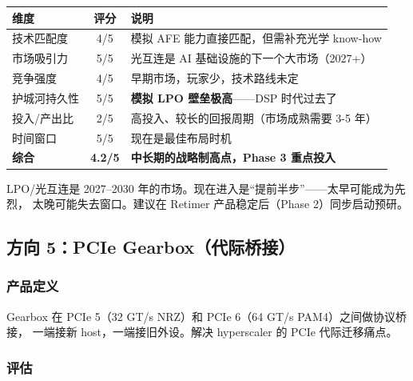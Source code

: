 \documentclass[11pt,a4paper]{ctexart}
\begin{document}
\begin{table}[htb]
    \centering
    \begin{tabular}{l c p{}}
        \toprule
        \textbf{维度} & \textbf{评分} & \textbf{说明} \\
        \midrule
        技术匹配度 & 4/5 & 模拟 AFE 能力直接匹配，但需补充光学 know-how \\
        市场吸引力 & 5/5 & 光互连是 AI 基础设施的下一个大市场（2027+） \\
        竞争强度 & 4/5 & 早期市场，玩家少，技术路线未定 \\
        护城河持久性 & 5/5 & \textbf{模拟 LPO 壁垒极高}——DSP 时代过去了 \\
        投入/产出比 & 2/5 & 高投入、较长的回报周期（市场成熟需要 3-5 年） \\
        时间窗口 & 5/5 & 现在是最佳布局时机 \\
        \midrule
        \rowcolor{strong}
        \textbf{综合} & \textbf{4.2/5} & \textbf{中长期的战略制高点，Phase 3 重点投入} \\
        \bottomrule
    \end{tabular}
\end{table}

\begin{warningbox}
    LPO/光互连是 2027--2030 年的市场。现在进入是``提前半步''——太早可能成为先烈，
    太晚可能失去窗口。建议在 Retimer 产品稳定后（Phase 2）同步启动预研。
\end{warningbox}

\subsection{方向 5：PCIe Gearbox（代际桥接）}

\subsubsection{产品定义}
Gearbox 在 PCIe 5（32 GT/s NRZ）和 PCIe 6（64 GT/s PAM4）之间做协议桥接，
一端接新 host，一端接旧外设。解决 hyperscaler 的 PCIe 代际迁移痛点。

\subsubsection{评估}
\end{document}
